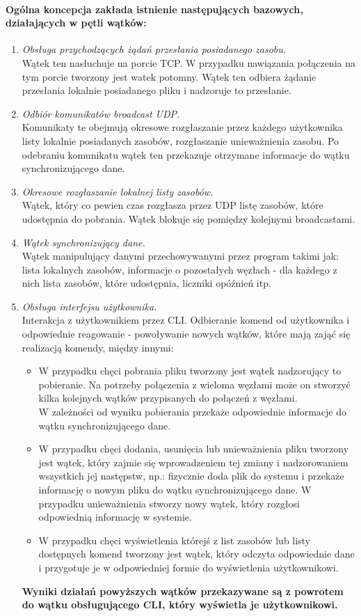 \documentclass[11pt]{book}
\newcommand{\+}{\discretionary{\mbox{\scriptsize$\hookleftarrow$}}{}{}}
\begin{document}
\paragraph{Ogólna koncepcja zakłada istnienie następujących bazowych, działających w pętli wątków:}
\begin{enumerate}
\item 
\textsl{Obsługa przychodzących żądań przesłania posiadanego zasobu.}\\
Wątek ten nasłuchuje na porcie TCP. W przypadku nawiązania połączenia na tym porcie tworzony jest watek potomny. Wątek ten odbiera żądanie przesłania lokalnie posiadanego pliku i nadzoruje to przesłanie. 
\item
\textsl{Odbiór komunikatów broadcast UDP.}\\
Komunikaty te obejmują okresowe rozgłaszanie przez każdego użytkownika listy lokalnie posiadanych zasobów, rozgłaszanie unieważnienia zasobu. Po odebraniu komunikatu wątek ten przekazuje otrzymane informacje do wątku synchronizującego dane.
\item
\textsl{Okresowe rozgłaszanie lokalnej listy zasobów.}\\
Wątek, który co pewien czas rozgłasza przez UDP listę zasobów, które udostępnia do pobrania. Wątek blokuje się pomiędzy kolejnymi broadcastami.  
\item
\textsl{Wątek synchronizujący dane.}\\
Wątek manipulujący danymi przechowywanymi przez program takimi jak: lista  lokalnych zasobów, informacje o pozostałych węzłach - dla każdego z nich lista zasobów, które udostępnia, liczniki opóźnień itp.
\item
\textsl{Obsługa interfejsu użytkownika.}\\
Interakcja z użytkownikiem przez CLI. Odbieranie komend od użytkownika i odpowiednie reagowanie - powoływanie nowych wątków, które mają zająć się realizacją komendy, między innymi: 
\begin{itemize}
\item
W przypadku chęci pobrania pliku tworzony jest wątek nadzorujący to pobieranie. Na potrzeby połączenia z wieloma węzłami może on stworzyć kilka kolejnych wątków przypisanych do połączeń z węzłami.\\
W zależności od wyniku pobierania przekaże odpowiednie informacje do wątku synchronizującego dane.
\item
W przypadku chęci dodania, usunięcia lub unieważnienia pliku tworzony jest wątek, który zajmie się wprowadzeniem tej zmiany i nadzorowaniem wszystkich jej następstw, np.: fizycznie doda plik do systemu i przekaże informację o nowym pliku do wątku synchronizującego dane. W przypadku unieważnienia stworzy nowy wątek, który rozgłosi odpowiednią informację w systemie.
\item
W przypadku chęci wyświetlenia którejś z list zasobów lub listy dostępnych komend tworzony jest wątek, który odczyta odpowiednie dane i przygotuje je w odpowiedniej formie do wyświetlenia użytkownikowi.
\end{itemize}
\textbf{Wyniki działań powyższych wątków przekazywane są z powrotem do wątku obsługującego CLI, który wyświetla je użytkownikowi.}
\end{enumerate}
\end{document}
